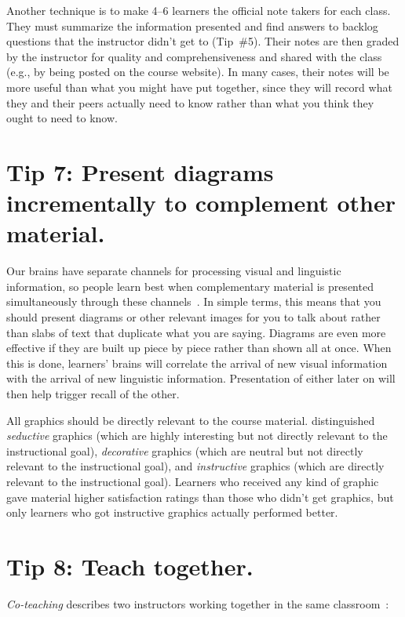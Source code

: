 \documentclass[10pt,letterpaper]{article}
\newcommand{\rulemajor}[1]{\section{#1}}
\begin{document}
Another technique is to make 4--6 learners the official note takers for each class.
They must summarize the information presented
and find answers to backlog questions that the instructor didn't get to (Tip~\#5).
Their notes are then graded by the instructor for quality and comprehensiveness
and shared with the class
(e.g., by being posted on the course website).
In many cases,
their notes will be more useful than what you might have put together,
since they will record what they and their peers actually need to know
rather than what you think they ought to need to know.

\rulemajor{Tip 7: Present diagrams incrementally to complement other material.}

Our brains have separate channels for
processing visual and linguistic information,
so people learn best when complementary material is presented simultaneously through these channels~\cite{Maye2003,Maye2009}.
In simple terms,
this means that you should present diagrams or other relevant images for you to talk about
rather than slabs of text that duplicate what you are saying.
Diagrams are even more effective if they are built up piece by piece rather than shown all at once.
When this is done,
learners' brains will correlate the arrival of new visual information
with the arrival of new linguistic information.
Presentation of either later on will then help trigger recall of the other.

All graphics should be directly relevant to the course material.
\cite{Sung2012} distinguished \emph{seductive} graphics
(which are highly interesting but not directly relevant to the instructional goal),
\emph{decorative} graphics
(which are neutral but not directly relevant to the instructional goal),
and \emph{instructive} graphics
(which are directly relevant to the instructional goal).
Learners who received any kind of graphic gave material higher satisfaction ratings
than those who didn't get graphics,
but only learners who got instructive graphics actually performed better.

\rulemajor{Tip 8: Teach together.}

\emph{Co-teaching} describes two instructors working together in the same classroom~\cite{Frie2016}:
\end{document}
